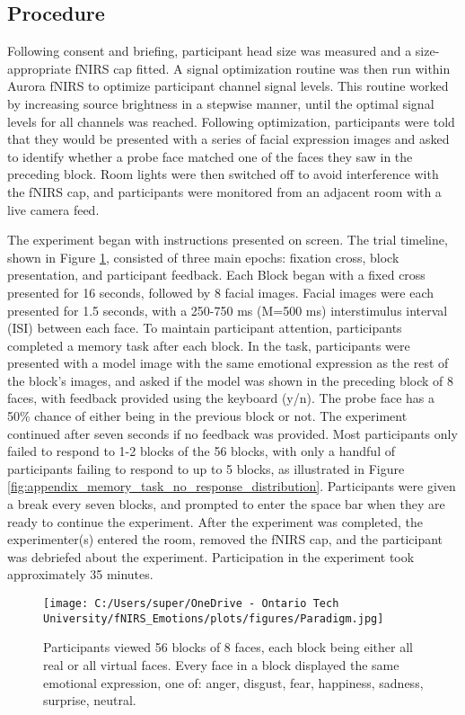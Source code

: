 \subsection{Procedure}
\label{sec:Procedure}
Following consent and briefing, participant head size was measured and a size-appropriate fNIRS cap fitted. 
A signal optimization routine was then run within Aurora fNIRS to optimize participant channel signal levels. 
This routine worked by increasing source brightness in a stepwise manner, until the optimal signal levels for all channels was reached. 
Following optimization, participants were told that they would be presented with a series of facial expression images and asked to identify whether a probe face matched one of the faces they saw in the preceding block. 
Room lights were then switched off to avoid interference with the fNIRS cap, and participants were monitored from an adjacent room with a live camera feed. 

The experiment began with instructions presented on screen. 
The trial timeline, shown in Figure \ref{fig:paradigm}, consisted of three main epochs: fixation cross, block presentation, and participant feedback. 
Each Block began with a fixed cross presented for 16 seconds, followed by 8 facial images. 
Facial images were each presented for 1.5 seconds, with a 250-750 ms (M=500 ms) interstimulus interval (ISI) between each face. 
To maintain participant attention, participants completed a memory task after each block. 
In the task, participants were presented with a model image with the same emotional expression as the rest of the block's images, and asked if the model was shown in the preceding block of 8 faces, with feedback provided using the keyboard (y/n). 
The probe face has a 50\% chance of either being in the previous block or not. 
The experiment continued after seven seconds if no feedback was provided. 
Most participants only failed to respond to 1-2 blocks of the 56 blocks, with only a handful of participants failing to respond to up to 5 blocks, as illustrated in Figure \ref{fig:appendix_memory_task_no_response_distribution}.
Participants were given a break every seven blocks, and prompted to enter the space bar when they are ready to continue the experiment. 
After the experiment was completed, the experimenter(s) entered the room, removed the fNIRS cap, and the participant was debriefed about the experiment. 
Participation in the experiment took approximately 35 minutes.

\begin{figure}[H]
    \centering
    \texttt{[image: C:/Users/super/OneDrive - Ontario Tech University/fNIRS\_Emotions/plots/figures/Paradigm.jpg]}
    \caption[Experimental paradigm overview]{Participants viewed 56 blocks of 8 faces, each block being either all real or all virtual faces.
    Every face in a block displayed the same emotional expression, one of: anger, disgust, fear, happiness, sadness, surprise, neutral. }
    \label{fig:paradigm}
\end{figure}

